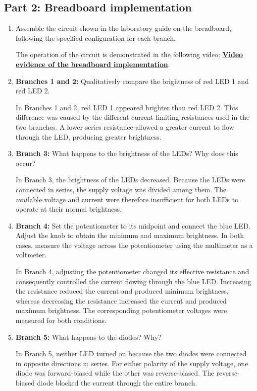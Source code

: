 \subsection{Part 2: Breadboard implementation}
\begin{enumerate}
    \item Assemble the circuit shown in the laboratory guide on the breadboard, following the specified configuration for each branch.
    \par \vspace{0.15cm}
    The operation of the circuit is demonstrated in the following video: \href{https://drive.google.com/file/d/1wEC5qJdxwSSljLp7xxYoH1fwVQjpyCVe/view?usp=sharing}{\textbf{Video evidence of the breadboard implementation}}.
    \item \textbf{Branches 1 and 2:} Qualitatively compare the brightness of red LED 1 and red LED 2.
    \par \vspace{0.15cm}
    In Branches 1 and 2, red LED 1 appeared brighter than red LED 2. This difference was caused by the different current-limiting resistances used in the two branches. A lower series resistance allowed a greater current to flow through the LED, producing greater brightness.

    \item \textbf{Branch 3:} What happens to the brightness of the LEDs? Why does this occur?
    \par \vspace{0.15cm}
    In Branch 3, the brightness of the LEDs decreased. Because the LEDs were connected in series, the supply voltage was divided among them. The available voltage and current were therefore insufficient for both LEDs to operate at their normal brightness.

    \item \textbf{Branch 4:} Set the potentiometer to its midpoint and connect the blue LED. Adjust the knob to obtain the minimum and maximum brightness. In both cases, measure the voltage across the potentiometer using the multimeter as a voltmeter.
    \par \vspace{0.15cm}
    In Branch 4, adjusting the potentiometer changed its effective resistance and consequently controlled the current flowing through the blue LED. Increasing the resistance reduced the current and produced minimum brightness, whereas decreasing the resistance increased the current and produced maximum brightness. The corresponding potentiometer voltages were measured for both conditions.

    
    \item \textbf{Branch 5:} What happens to the diodes? Why? 
    \par \vspace{0.15cm}
    In Branch 5, neither LED turned on because the two diodes were connected in opposite directions in series. For either polarity of the supply voltage, one diode was forward-biased while the other was reverse-biased. The reverse-biased diode blocked the current through the entire branch.
\end{enumerate}

